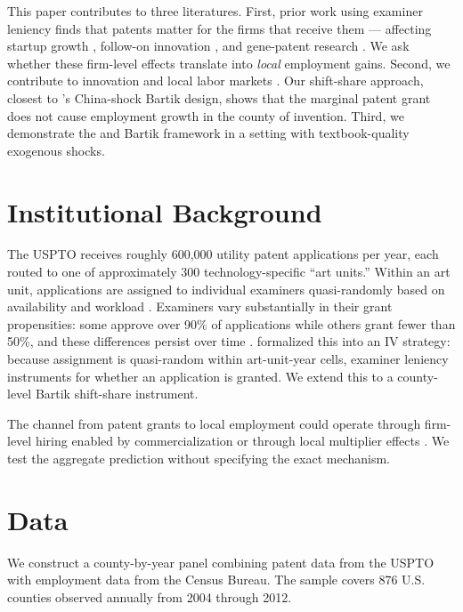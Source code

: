 \documentclass[12pt]{article}
\begin{document}
This paper contributes to three literatures. First, prior work using examiner leniency finds that patents matter for the firms that receive them --- affecting startup growth \citep{farre2020patent}, follow-on innovation \citep{galasso2015patents}, and gene-patent research \citep{sampat2019examiners}. We ask whether these firm-level effects translate into \textit{local} employment gains. Second, we contribute to innovation and local labor markets \citep{moretti2019geography,bloom2013identifying,jaffe1993geographic}. Our shift-share approach, closest to \citet{autor2013china}'s China-shock Bartik design, shows that the marginal patent grant does not cause employment growth in the county of invention. Third, we demonstrate the \citet{goldsmith2020bartik} and \citet{borusyak2022shift} Bartik framework in a setting with textbook-quality exogenous shocks.

\section{Institutional Background}
\label{sec:background}

The USPTO receives roughly 600,000 utility patent applications per year, each routed to one of approximately 300 technology-specific ``art units.'' Within an art unit, applications are assigned to individual examiners quasi-randomly based on availability and workload \citep{lemley2012examiner,righi2023patent}. Examiners vary substantially in their grant propensities: some approve over 90\% of applications while others grant fewer than 50\%, and these differences persist over time \citep{cockburn2003patents,lemley2012examiner}. \citet{sampat2019examiners} formalized this into an IV strategy: because assignment is quasi-random within art-unit-year cells, examiner leniency instruments for whether an application is granted. We extend this to a county-level Bartik shift-share instrument.

The channel from patent grants to local employment could operate through firm-level hiring enabled by commercialization \citep{farre2020patent} or through local multiplier effects \citep{moretti2010local}. We test the aggregate prediction without specifying the exact mechanism.


\section{Data}
\label{sec:data}

We construct a county-by-year panel combining patent data from the USPTO with employment data from the Census Bureau. The sample covers 876 U.S. counties observed annually from 2004 through 2012.
\end{document}
